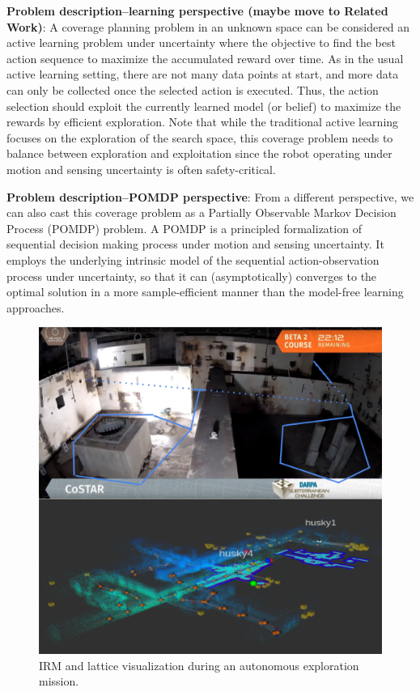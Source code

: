 \documentclass{article}
\newcommand{\ph}[1]{{\textbf{#1}:}} %
\begin{document}
\ph{Problem description--learning perspective (maybe move to Related Work)}
A coverage planning problem in an unknown space can be considered an active learning problem under uncertainty where the objective to find the best action sequence to maximize the accumulated reward over time.
As in the usual active learning setting, there are not many data points at start, and more data can only be collected once the selected action is executed.
Thus, the action selection should exploit the currently learned model (or belief) to maximize the rewards by efficient exploration.
Note that while the traditional active learning focuses on the exploration of the search space, this coverage problem needs to balance between exploration and exploitation since the robot operating under motion and sensing uncertainty is often safety-critical. 

\ph{Problem description--POMDP perspective}
From a different perspective, we can also cast this coverage problem as a Partially Observable Markov Decision Process (POMDP) problem. 
A POMDP is a principled formalization of sequential decision making process under motion and sensing uncertainty.
It employs the underlying intrinsic model of the sequential action-observation process under uncertainty, so that it can (asymptotically) converges to the optimal solution in a more sample-efficient manner than the model-free learning approaches.




\begin{figure}[t]
  \centering
  \includegraphics[width=.7\textwidth,trim={0 0 0 11.0cm},clip]{figures/firstpage_v2.png}
  \caption{ %
  IRM and lattice visualization during an autonomous exploration mission.}
  \label{fig:firstPage}
\end{figure}
\end{document}
